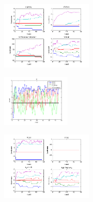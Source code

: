 \documentclass[conference]{IEEEtran}
\begin{document}
\begin{figure}[h]
	\center	
	\includegraphics[width=0.4\textwidth]{fig/sutton_random_qr.png}
	\caption{}
	\label{sutton_random_qr}
\end{figure}

\begin{figure}[h]
	\center	
	\includegraphics[width=0.3\textwidth]{fig/ucb_random_r.png}
	\caption{}
	\label{ucb_random_r}
\end{figure}


\begin{figure}[h]
	\center	
	\includegraphics[width=0.4\textwidth]{fig/ucb_random_qr.png}
	\caption{}
	\label{ucb_random_qr}
\end{figure}




\end{document}
